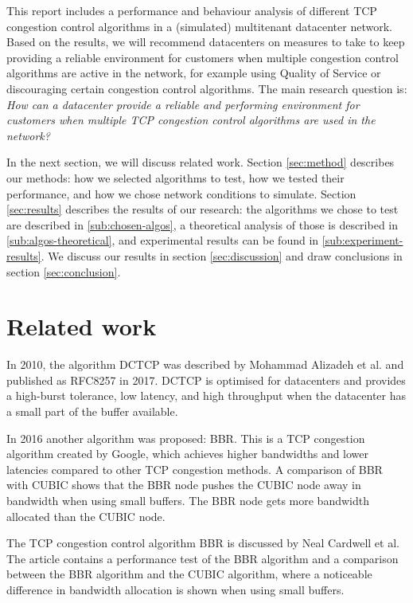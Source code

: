 \documentclass{article}
\begin{document}
This report includes a performance and behaviour analysis of different TCP congestion control algorithms in a (simulated) multitenant datacenter network. Based on the results, we will recommend datacenters on measures to take to keep providing a reliable environment for customers when multiple congestion control algorithms are active in the network, for example using Quality of Service or discouraging certain congestion control algorithms. The main research question is: {\it How can a datacenter provide a reliable and performing environment for customers when multiple TCP congestion control algorithms are used in the
network?}

In the next section, we will discuss related work. Section \ref{sec:method}
describes our methods: how we selected algorithms to test, how we tested their
performance, and how we chose network conditions to simulate. Section
\ref{sec:results} describes the results of our research: the algorithms we
chose to test are described in \ref{sub:chosen-algos}, a theoretical analysis
of those is described in \ref{sub:algos-theoretical}, and experimental results
can be found in \ref{sub:experiment-results}. We discuss our results in section
\ref{sec:discussion} and draw conclusions in section \ref{sec:conclusion}.


\section{Related work}

In 2010, the algorithm DCTCP was described by Mohammad Alizadeh et
al.\cite{dctcp-congestion-original} and published as
RFC8257\cite{dctcp-congestion} in 2017. DCTCP is optimised for datacenters and
provides a high-burst tolerance, low latency, and high throughput when the
datacenter has a small part of the buffer available\cite{dctcp-congestion}.

In 2016 another algorithm was proposed: BBR. This is a TCP congestion algorithm
created by Google, which achieves higher bandwidths and lower latencies
compared to other TCP congestion methods\cite{bbr-congestion}. A comparison of
BBR with CUBIC\cite{bbr-congestion-comparison} shows that the BBR node pushes
the CUBIC node away in bandwidth when using small buffers. The BBR node gets
more bandwidth allocated than the CUBIC node.

The TCP congestion control algorithm BBR is discussed by Neal Cardwell et
al.\cite{bbr-congestion} The article contains a performance test of the BBR
algorithm and a comparison between the BBR algorithm and the CUBIC algorithm,
where a noticeable difference in bandwidth allocation is shown when using small
buffers.
\end{document}
